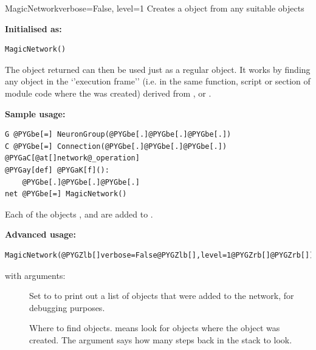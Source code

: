 \documentclass[letterpaper,10pt,english]{manual}
\begin{document}
\hypertarget{brian.MagicNetwork}{}\begin{classdesc}{MagicNetwork}{verbose=False, level=1}
Creates a \hyperlink{brian.Network}{} object from any suitable objects

\textbf{Initialised as:}

\begin{Verbatim}[commandchars=@\[\]]
MagicNetwork()
\end{Verbatim}

The object returned can then be used just as a regular
\hyperlink{brian.Network}{} object. It works by finding any object in
the `'execution frame'' (i.e. in the same function, script
or section of module code where the \hyperlink{brian.MagicNetwork}{} was
created) derived from \hyperlink{brian.NeuronGroup}{}, \hyperlink{brian.Connection}{} or
\hyperlink{brian.NetworkOperation}{}.

\textbf{Sample usage:}

\begin{Verbatim}[commandchars=@\[\]]
G @PYGbe[=] NeuronGroup(@PYGbe[.]@PYGbe[.]@PYGbe[.])
C @PYGbe[=] Connection(@PYGbe[.]@PYGbe[.]@PYGbe[.])
@PYGaC[@at[]network@_operation]
@PYGay[def] @PYGaK[f]():
    @PYGbe[.]@PYGbe[.]@PYGbe[.]
net @PYGbe[=] MagicNetwork()
\end{Verbatim}

Each of the objects ,  and  are added to .

\textbf{Advanced usage:}

\begin{Verbatim}[commandchars=@\[\]]
MagicNetwork(@PYGZlb[]verbose=False@PYGZlb[],level=1@PYGZrb[]@PYGZrb[])
\end{Verbatim}

with arguments:
\begin{description}
\item[]
Set to  to print out a list of objects that were
added to the network, for debugging purposes.

\item[]
Where to find objects.  means look for objects
where the \hyperlink{brian.MagicNetwork}{} object was created. The 
argument says how many steps back in the stack to look.

\end{description}
\end{classdesc}
\end{document}
